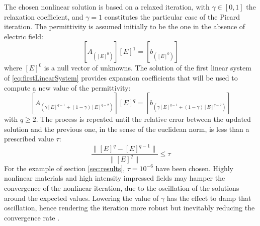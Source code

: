 \documentclass[journal]{IEEEtran}
\begin{document}
The chosen nonlinear solution is based on a relaxed iteration, with $\gamma \in [0,1]$ the relaxation coefficient, and $\gamma = 1$ constitutes the particular case of the Picard iteration. The permittivity is assumed initially to be the one in the absence of electric field: 
\begin{equation} \label{eq:firstLinearSystem}
[A_{([E]^0)}] [E]^1 = [b_{([E]^0)}]
\end{equation} where $[E]^0$ is a null vector of unknowns. The solution of the first linear system of \eqref{eq:firstLinearSystem} provides expansion coefficients that will be used to compute a new value of the permittivity:
\begin{equation} \label{eq:lastLinearSystem}
[A_{(\gamma [E]^{q-1} + (1-\gamma) [E]^{q-2})}] [E]^{q} = [b_{(\gamma [E]^{q-1} + (1-\gamma) [E]^{q-2})}]
\end{equation}
with $q \geq 2$. The process is repeated until the relative error between the updated solution and the previous one, in the sense of the euclidean norm, is less than a prescribed value $\tau$:
\begin{equation}
\frac{\|[E]^{q} - [E]^{q-1} \|}{\| [E]^{q} \|} \leq \tau
\end{equation}
For the example of section \ref{sec:results}, $\tau = 10^{-6}$ have been chosen. Highly nonlinear materials and high intensity impressed fields may hamper the convergence of the nonlinear iteration, due to the oscillation of the solutions around the expected values. Lowering the value of $\gamma$ has the effect to damp that oscillation, hence rendering the iteration more robust but inevitably reducing the convergence rate %
\cite{Silvester1997}.
\end{document}
